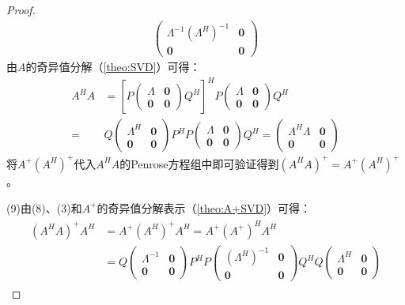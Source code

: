 \begin{proof}
\begin{align*}
\begin{pmatrix}
			\varLambda^{-1}(\varLambda^{H})^{-1} & \mathbf{0} \\
			\mathbf{0} & \mathbf{0}
		\end{pmatrix}
	\end{align*}
	由$A$的奇异值分解（\cref{theo:SVD}）可得：
	\begin{align*}
		A^HA&=\left[P
		\begin{pmatrix}
			\varLambda & \mathbf{0} \\
			\mathbf{0} & \mathbf{0}
		\end{pmatrix}Q^H\right]^HP
		\begin{pmatrix}
			\varLambda & \mathbf{0} \\
			\mathbf{0} & \mathbf{0}
		\end{pmatrix}Q^H \\
		=&Q
		\begin{pmatrix}
			\varLambda^H & \mathbf{0} \\
			\mathbf{0} & \mathbf{0}
		\end{pmatrix}
		P^HP
		\begin{pmatrix}
			\varLambda & \mathbf{0} \\
			\mathbf{0} & \mathbf{0}
		\end{pmatrix}Q^H
		=\begin{pmatrix}
			\varLambda^H\varLambda & \mathbf{0} \\
			\mathbf{0} & \mathbf{0}
		\end{pmatrix}
	\end{align*}
	将$A^+(A^H)^+$代入$A^HA$的Penrose方程组中即可验证得到$(A^HA)^+=A^+(A^H)^+$。\par
	(9)由(8)、(3)和$A^+$的奇异值分解表示（\cref{theo:A+SVD}）可得：
	\begin{gather*}
		\begin{aligned}
			(A^HA)^+A^H
			&=A^+(A^H)^+A^H
			=A^+(A^+)^HA^H \\
			&=Q
			\begin{pmatrix}
				\varLambda^{-1} & \mathbf{0} \\
				\mathbf{0} & \mathbf{0}
			\end{pmatrix}
			P^HP
			\begin{pmatrix}
				(\varLambda^H)^{-1} & \mathbf{0} \\
				\mathbf{0} & \mathbf{0}
			\end{pmatrix}
			Q^HQ
			\begin{pmatrix}
				\varLambda^H & \mathbf{0} \\
				\mathbf{0} & \mathbf{0}
			\end{pmatrix}

\end{aligned}
\end{gather*}
\end{proof}
